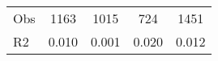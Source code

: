 \begin{tabular}{l*{4}{c}}
\hline                                                                                                                                                                                                                                            
 Obs                   &               1163               &       1015                       &       724                &              1451                                               \\ 
 R2                    &                      0.010              &              0.001                      &              0.020               &                     0.012                                              \\ 
\hline \end{tabular}                                                                                                                                                                                                              